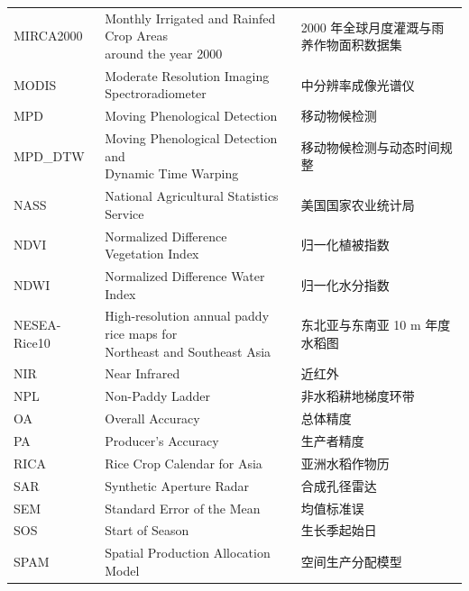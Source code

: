 \begin{center}
\begin{longtable}{@{}m{3cm}m{7.3cm}m{4.8cm}@{}}
        MIRCA2000&\makecell[l]{Monthly Irrigated and Rainfed Crop Areas \\around the year 2000}&2000 年全球月度灌溉与雨养作物面积数据集\\
        MODIS&\makecell[l]{Moderate Resolution Imaging \\Spectroradiometer}&中分辨率成像光谱仪\\
        MPD&Moving Phenological Detection&移动物候检测\\
        MPD\_DTW&\makecell[l]{Moving Phenological Detection and \\Dynamic Time Warping}&移动物候检测与动态时间规整\\
        NASS&National Agricultural Statistics Service&美国国家农业统计局\\
        NDVI&Normalized Difference Vegetation Index&归一化植被指数\\
        NDWI&Normalized Difference Water Index&归一化水分指数\\
        NESEA-Rice10&\makecell[l]{High-resolution annual paddy rice maps for \\Northeast and Southeast Asia}&东北亚与东南亚 10 m 年度水稻图\\
        NIR&Near Infrared&近红外\\
        NPL&Non-Paddy Ladder&非水稻耕地梯度环带\\
        OA&Overall Accuracy&总体精度\\
        PA&Producer's Accuracy&生产者精度\\
        RICA&Rice Crop Calendar for Asia&亚洲水稻作物历\\
        SAR&Synthetic Aperture Radar&合成孔径雷达\\
        SEM&Standard Error of the Mean&均值标准误\\
        SOS&Start of Season&生长季起始日\\
        SPAM&Spatial Production Allocation Model&空间生产分配模型\\

\end{longtable}
\end{center}
